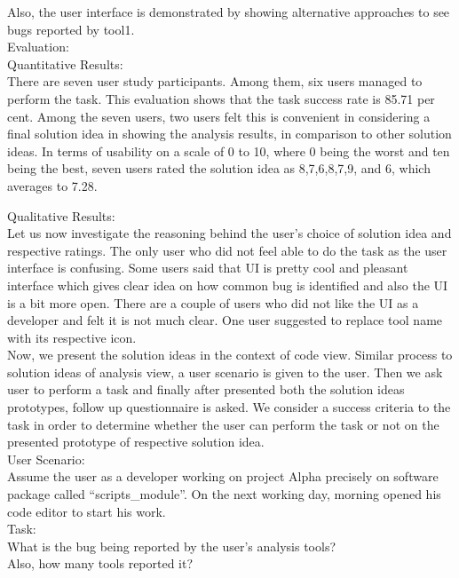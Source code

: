 Also, the user interface is demonstrated by showing alternative approaches to see bugs reported by tool1. \\

Evaluation: \\

Quantitative Results: \\
There are seven user study participants. Among them, six users managed to perform the task. This evaluation shows that the task success rate is 85.71 per cent.
Among the seven users, two users felt this is convenient in considering a final solution idea in showing the analysis results, in comparison to other solution ideas. In terms of usability on a scale of 0 to 10, where 0 being the worst and ten being the best, seven users rated the solution idea as 8,7,6,8,7,9, and 6, which averages to 7.28. 

Qualitative Results: \\

Let us now investigate the reasoning behind the user’s choice of solution idea and respective ratings. The only user who did not feel able to do the task as the user interface is confusing. Some users said that UI is pretty cool and pleasant interface which gives clear idea on how common bug is identified and also the UI is a bit more open. There are a couple of users who did not like the UI as a developer and felt it is not much clear. One user suggested to replace tool name with its respective icon. \\

Now, we present the solution ideas in the context of code view. Similar process to solution ideas of analysis view, a user scenario is given to the user. Then we ask user to perform a task and finally after presented both the solution ideas prototypes, follow up questionnaire is asked. We consider a success criteria to the task in order to determine whether the user can perform the task or not on the presented prototype of respective solution idea. \\

User Scenario: \\

Assume the user as a developer working on project Alpha precisely on software package called “scripts\_module”. On the next working day, morning opened his code editor to start his work. \\

Task: \\

What is the bug being reported by the user’s analysis tools? \\ Also, how many tools reported it? \\

